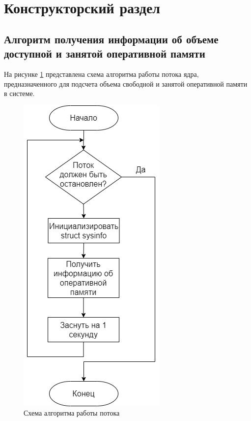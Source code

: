 \section{Конструкторский раздел}

\subsection{Алгоритм получения информации об объеме доступной и занятой оперативной памяти}

На рисунке \ref{fig:kthread} представлена схема алгоритма работы потока ядра, предназначенного для подсчета объема свободной и занятой оперативной памяти в системе.

\begin{figure}[h!]
	\begin{center}
		\includegraphics[scale=0.5]{jpg/kthread.png}
	\end{center}
	\captionsetup{justification=centering}
	\caption{Схема алгоритма работы потока}
	\label{fig:kthread}
\end{figure}

